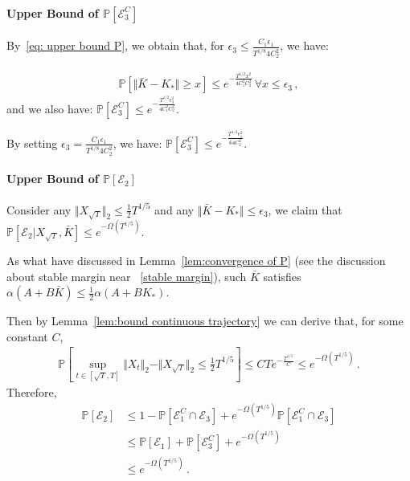 \documentclass{article}
\theoremstyle{definition}
\begin{document}
\paragraph{Upper Bound of $\mathbb{P}[\mathcal{E}^{C}_{3}]$}
By~\eqref{eq: upper bound P}, we obtain that, for $\epsilon_{3}\leq \frac{C_{1}\epsilon_{1}}{T^{1/8}4C^{2}_{2}}$, we have:

\begin{align*}
\mathbb{P}\left[\Vert \bar{K}-K_{*}\Vert\geq x\right]\leq e^{-\frac{T^{1/2}x^{2}}{4C_{1}^{2}C_{2}^{2}}}\,\forall x\leq\epsilon_{3}\,,
\end{align*}
and we also have: $\mathbb{P}[\mathcal{E}^{C}_{3}]\leq e^{-\frac{T^{1/2}\epsilon_{3}^{2}}{4C_{1}^{2}C_{2}^{2}}}$.

By setting $\epsilon_{3}= \frac{C_{1}\epsilon_{1}}{T^{1/8}4C^{2}_{2}}$, we have: $\mathbb{P}[\mathcal{E}^{C}_{3}]\leq e^{-\frac{T^{1/4}\epsilon_{1}^{2}}{64C_{2}^{2}}}$.

\paragraph{Upper Bound of $\mathbb{P}[\mathcal{E}_{2}]$}
Consider any $\Vert X_{\sqrt{T}}\Vert_{2}\leq \frac{1}{2}T^{1/5}$ and any $\Vert \bar{K}-K_{*}\Vert\leq \epsilon_{3}$, we claim that $\mathbb{P}\left[\mathcal{E}_{2}\big\vert X_{\sqrt{T}},\bar{K}\right]\leq e^{-\Omega(T^{1/5})}$.

As what have discussed in Lemma~\ref{lem:convergence of P} (see the discussion about stable margin near ~\eqref{stable margin}), such $\bar{K}$ satisfies $\alpha(A+B\bar{K})\leq \frac{1}{2}\alpha(A+BK_{*})$.

Then by Lemma~\ref{lem:bound continuous trajectory} we can derive that, for some constant $C$, 
\begin{align*}
\mathbb{P}\left[\sup_{t\in[\sqrt{T},T]}\Vert X_{t}\Vert_{2}-\Vert X_{\sqrt{T}}\Vert_{2}\leq \frac{1}{2}T^{1/5}\right]\leq CTe^{-\frac{T^{1/5}}{C}}\leq e^{-\Omega(T^{1/5})}\,.
\end{align*}
Therefore, 
\begin{align*}
\mathbb{P}\left[\mathcal{E}_{2}\right]&\leq 1-\mathbb{P}\left[\mathcal{E}^{C}_{1}\cap \mathcal{E}_{3}\right]+e^{-\Omega(T^{1/5})}\mathbb{P}\left[\mathcal{E}^{C}_{1}\cap \mathcal{E}_{3}\right]\\
&\leq \mathbb{P}\left[\mathcal{E}_{1}\right]+\mathbb{P}\left[\mathcal{E}^{C}_{3}\right]+e^{-\Omega(T^{1/5})}\\
&\leq e^{-\Omega(T^{1/5})}\,.
\end{align*}
\end{document}
